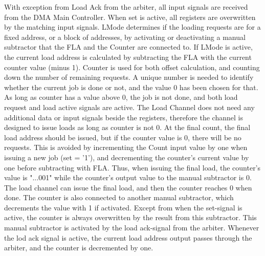 With exception from Load Ack from the arbiter, all input signals are received from the DMA Main Controller.
When set is active, all registers are overwritten by the matching input signals.
LMode determines if the loading requests are for a fixed address, or a block of addresses, by activating or deactivating a manual subtractor that the FLA and the Counter are connected to.
If LMode is active, the current load address is calculated by subtracting the FLA with the current counter value (minus 1).
Counter is used for both offset calculation, and counting down the number of remaining requests.
A unique number is needed to identify whether the current job is done or not, and the value 0 has been chosen for that.
As long as counter has a value above 0, the job is not done, and both load request and load active signals are active.
The Load Channel does not need any additional data or input signals beside the registers, therefore the channel is designed to issue loads as long as counter is not 0.
At the final count, the final load address should be issued, but if the counter value is 0, there will be no requests.
This is avoided by incrementing the Count input value by one when issuing a new job (set = '1'), and decrementing the counter's current value by one before subtracting with FLA.
Thus, when issuing the final load, the counter's value is "...001" while the counter's output value to the manual subtractor is 0.
The load channel can issue the final load, and then the counter reaches 0 when done.
The counter is also connected to another manual subtractor, which decrements the value with 1 if activated.
Except from when the set-signal is active, the counter is always overwritten by the result from this subtractor.
This manual subtractor is activated by the load ack-signal from the arbiter.
Whenever the lod ack signal is active, the current load address output passes through the arbiter, and the counter is decremented by one.

